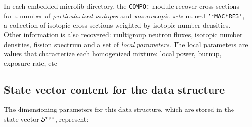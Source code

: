 \vskip 0.1cm

In each embedded {\sc microlib} directory, the {\tt COMPO:} module recover
cross sections for a number of {\sl particularized isotopes} and {\sl macroscopic
sets} named {\tt '*MAC*RES'}, a collection of isotopic cross sections weighted by
isotopic number densities. Other information is also recovered: multigroup neutron
fluxes, isotopic number densities, fission spectrum and a set
of {\sl local parameters}. The local parameters are values that characterize each
homogenized mixture: local power, burnup, exposure rate, etc.

\subsection{State vector content for the  data structure}\label{sect:multicompostate}

The dimensioning parameters for this data structure, which are stored in the state vector
$\mathcal{S}^{\rm cpo}$, represent:

